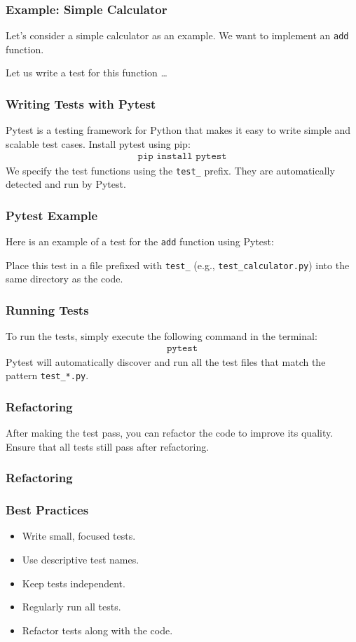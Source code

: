 \documentclass{beamer}
\begin{document}
\begin{frame}
  \frametitle{Example: Simple Calculator}
  Let's consider a simple calculator as an example. We want to implement an \texttt{add} function.
  
  \vspace{5mm}
  Let us write a test for this function \dots
\end{frame}

\begin{frame}
  \frametitle{Writing Tests with Pytest}
  Pytest is a testing framework for Python that makes it easy to write simple and scalable test cases.
  Install pytest using pip:
  \begin{align*}
  \texttt{pip install pytest}
  \end{align*}
  We specify the test functions using the \texttt{test\_} prefix. They are automatically detected and run by Pytest.
\end{frame}

\begin{frame}
  \frametitle{Pytest Example}
  Here is an example of a test for the \texttt{add} function using Pytest:
  
  Place this test in a file prefixed with \texttt{test\_} (e.g., \texttt{test\_calculator.py}) into the same directory as the code.
\end{frame}

\begin{frame}
  \frametitle{Running Tests}
  To run the tests, simply execute the following command in the terminal:
  \begin{align*}
  \texttt{pytest}
  \end{align*}
  Pytest will automatically discover and run all the test files that match the pattern \texttt{test\_*.py}.
\end{frame}

\begin{frame}
  \frametitle{Refactoring}
  After making the test pass, you can refactor the code to improve its quality. Ensure that all tests still pass after refactoring.
  
\end{frame}
\begin{frame}
  \frametitle{Refactoring}
  
\end{frame}
\begin{frame}
  \frametitle{Best Practices}
  \begin{itemize}
    \item Write small, focused tests.
    \item Use descriptive test names.
    \item Keep tests independent.
    \item Regularly run all tests.
    \item Refactor tests along with the code.
  \end{itemize}
\end{frame}
\end{document}
